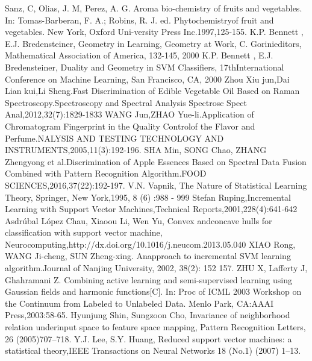 \documentclass[a4paper]{article}
\begin{document}
\renewcommand\refname{References}
\begin{thebibliography}{30}
    Sanz, C, Olias,  J.  M,  Perez,  A.  G. Aroma  bio-chemistry  of  fruits  and  vegetables.  In:  Tomas-Barberan,  F. A.; Robins, R. J. ed. Phytochemistryof  fruit  and  vegetables.  New  York,  Oxford  Uni-versity  Press  Inc.1997,125-155.
    K.P. Bennett , E.J. Bredensteiner, Geometry in Learning, Geometry at Work, C. Gorinieditors, Mathematical Association of America, 132-145, 2000
    K.P. Bennett , E.J. Bredensteiner, Duality and Geometry in SVM Classiﬁers, 17thInternational Conference on Machine Learning, San Francisco, CA, 2000
    Zhou Xiu jun,Dai Lian kui,Li Sheng.Fast Discrimination of Edible Vegetable Oil Based on Raman Spectroscopy.Spectroscopy and Spectral Analysis Spectrosc Spect Anal,2012,32(7):1829-1833
    WANG Jun,ZHAO Yue-li.Application of Chromatogram Fingerprint in the Quality Controlof the Flavor and Perfume.NALYSIS AND TESTING TECHNOLOGY AND INSTRUMENTS,2005,11(3):192-196.
    SHA Min, SONG Chao, ZHANG Zhengyong et al.Discrimination of Apple Essences Based on Spectral Data Fusion Combined with Pattern Recognition Algorithm.FOOD SCIENCES,2016,37(22):192-197.
    V.N. Vapnik, The Nature of Statistical Learning Theory, Springer, New York,1995, 8 (6) :988 - 999
    Stefan Ruping,Incremental Learning with Support Vector Machines,Technical Reports,2001,228(4):641-642
    Asdrúbal López Chau, Xiaoou Li, Wen Yu, Convex andconcave hulls for classification with support vector machine, Neurocomputing,http://dx.doi.org/10.1016/j.neucom.2013.05.040
    XIAO Rong, WANG Ji-cheng, SUN Zheng-xing. Anapproach to incremental SVM learning algorithm.Journal of Nanjing University, 2002, 38(2): 152 157.           
    ZHU X, Lafferty J, Ghahramani Z. Combining active learning and semi-supervised learning using Gaussian fields  and  harmonic  functions[C].  In:  Proc  of  ICML  2003  Workshop  on  the  Continuum  from  Labeled  to Unlabeled Data. Menlo Park, CA:AAAI Press,2003:58-65.
    Hyunjung Shin, Sungzoon Cho, Invariance of neighborhood relation underinput space to feature space mapping, Pattern Recognition Letters, 26 (2005)707–718.
    Y.J. Lee, S.Y. Huang, Reduced support vector machines: a statistical theory,IEEE Transactions on Neural Networks 18 (No.1) (2007) 1–13.

        
\end{thebibliography}
\end{document}
